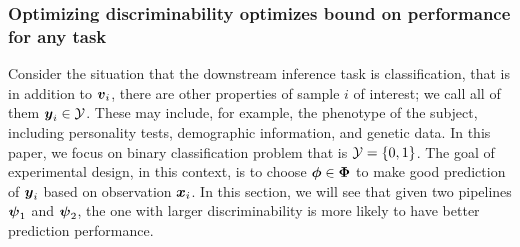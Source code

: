 \documentclass{article}
\begin{document}
\subsubsection{Optimizing discriminability optimizes bound on performance for any task}

Consider the situation that the downstream inference task is classification, that is in addition to $\boldsymbol{v}_i$, there are other properties of sample $i$ of interest; we call all of them $\boldsymbol{y}_i \in \mathcal{Y}$.  These may include, for example, the phenotype of the subject, including personality tests, demographic information, and genetic data. In this paper, we focus on binary classification problem that is $\mathcal{Y}=\{0,1\}$. The goal of experimental design, in this context, is to choose $\boldsymbol{\phi} \in \boldsymbol{\Phi}$ to make good prediction of $\boldsymbol{y}_i$ based on observation $\boldsymbol{x}_i$. In this section, we will see that given two pipelines $\boldsymbol{\psi}_1$ and $\boldsymbol{\psi}_2$, the one with larger discriminability is more likely to have better prediction performance.  
\end{document}
